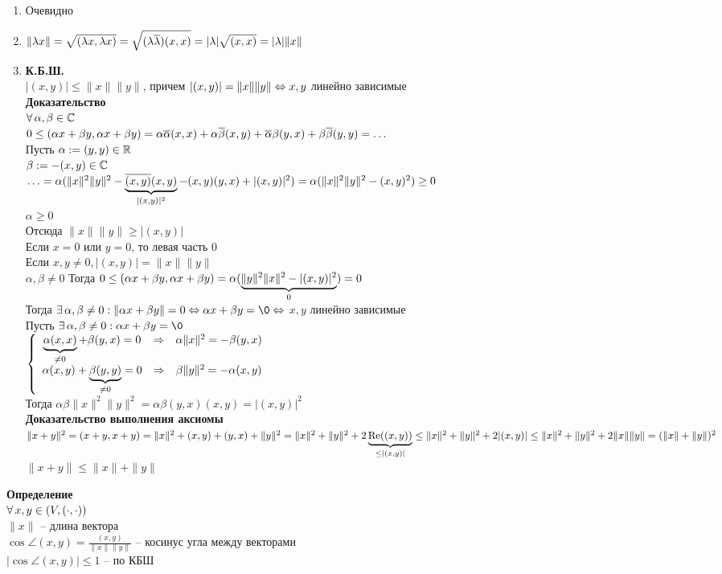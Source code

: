 \documentclass[12pt]{article}
\begin{document}
\begin{enumerate}
    \item Очевидно
    \item $\|\lambda x\| = \sqrt{(\lambda x, \lambda x)} = \sqrt{(\lambda\ol\lambda)(x,x)} = |\lambda|\sqrt{(x,x)} = |\lambda|\|x\|$
    \item \textbf{К.Б.Ш.}\\
    $|(x,y)| \leq \|x\|\|y\|$, причем $|(x,y)| = \|x\|\|y\| \LRto x,y$ линейно зависимые\\
    \textbf{Доказательство}\\
    $\fall \alpha, \beta \in \Cset$\\
    $0 \leq (\alpha x + \beta y, \alpha x + \beta y) = \alpha\ol\alpha(x,x) + \alpha\ol\beta(x,y) + \ol\alpha\beta(y,x) + \beta\ol\beta(y,y) = \ldots$\\
    Пусть $\alpha:= (y,y) \in \Rset$\\
    $\beta := -(x,y) \in \Cset$\\
    $\ldots = \alpha(\|x\|^2\|y\|^2 - \ub{|(x,y)|^2}{\ol{(x,y)}(x,y)} - (x,y)(y,x) + |(x,y)|^2) = \alpha(\|x\|^2\|y\|^2 - (x,y)^2) \geq 0$\\
    $\alpha \geq 0$\\
    Отсюда $\|x\|\|y\| \geq |(x,y)|$\\
    Если $x = 0$ или $y = 0$, то левая часть 0\\
    Если $x,y\neq 0, |(x,y)|=\|x\|\|y\|$\\
    $\alpha, \beta \neq 0$
    Тогда $0 \leq (\alpha x + \beta y, \alpha x + \beta y) = \alpha(\ub{0}{\|y\|^2\|x\|^2 - |(x,y)|^2}) = 0$\\
    Тогда $\ex \alpha, \beta \neq 0 : \|\alpha x + \beta y\| = 0 \LRto \alpha x + \beta y = \0 \LRto$ $x, y$ линейно зависимые\\
    Пусть $\ex \alpha, \beta \neq 0: \alpha x + \beta y = \0$\\
    $\left\{\begin{array}{ccc}
        \ub{\neq 0}{\alpha (x,x)} + \beta(y,x) = 0 & \Rto & \alpha\|x\|^2 = -\beta(y,x)\\
        \alpha (x,y) + \ub{\neq 0}{\beta(y,y)} = 0 & \Rto & \beta\|y\|^2 = -\alpha(x,y)
    \end{array}\right.$\\
    Тогда $\alpha\beta\|x\|^2\|y\|^2 = \alpha\beta(y,x)(x,y) = |(x,y)|^2$\\
    \textbf{Доказательство выполнения аксиомы}\\
    $\|x+y\|^2 = (x+y,x+y) = \|x\|^2 + (x,y) + (y, x) + \|y\|^2 = \|x\|^2 + \|y\|^2 + 2\ub{\leq |(x,y)|}{\re((x,y))} \leq \|x\|^2 + \|y\|^2 + 2|(x,y)| \leq \|x\|^2+\|y\|^2 + 2\|x\|\|y\| = (\|x\|+\|y\|)^2$\\
    $\|x+y\| \leq \|x\| + \|y\|$
\end{enumerate}
\textbf{Определение}\\
$\fall x, y \in (V, (\cdot, \cdot))$\\
$\|x\|$ -- длина вектора\\
$\cos \angle(x,y) = \frac{(x,y)}{\|x\|\|y\|}$ -- косинус угла между векторами\\
$|\cos \angle(x,y)| \leq 1$ -- по КБШ\\
\end{document}
